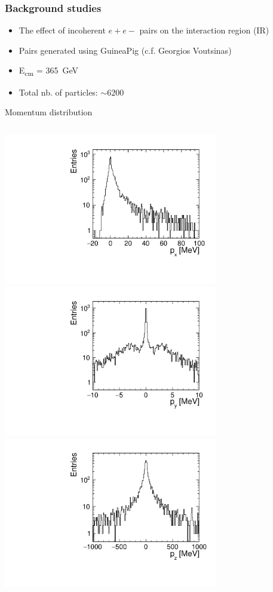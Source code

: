 \documentclass[hyperref={colorlinks=true,pdfpagelabels=false,linkcolor=black}, xcolor=dvipsnames,10pt]{beamer}
\begin{document}
\begin{frame}
	\frametitle{Background studies}

	\begin{itemize}
	\item The effect of incoherent $e+e-$ pairs on the interaction region (IR)
	\item Pairs generated using GuineaPig (c.f. Georgios Voutsinas)
	\item E\textsubscript{cm} = 365~GeV
	\item Total nb. of particles: $\sim6200$
	\end{itemize}		
	
	\begin{block}{Momentum distribution}
	\begin{columns}
		\centering
		\includegraphics[width=0.7\textwidth]{../figures/incoherentPairs_px.pdf} \\									\includegraphics[width=0.7\textwidth]{../figures/incoherentPairs_py.pdf}
		\centering
		\includegraphics[width=0.7\textwidth]{../figures/incoherentPairs_pz.pdf}  \\

\end{columns}
\end{block}
\end{frame}
\end{document}
